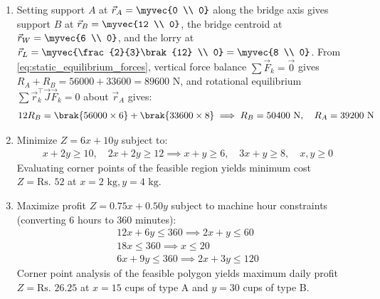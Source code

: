 \begin{enumerate}[label=\thesubsection.\arabic*, ref=\thesubsection.\theenumi]
\begin{enumerate}[label=\brak{\alph*}]
\begin{figure}[H]
			The following code stimulates the result.
			\vspace{0.5em}
			\noindent{}
		\end{figure}
		\item Setting support $A$ at $\vec{r}_A = \myvec{0 \\ 0}$ along the bridge axis gives support $B$ at $\vec{r}_B = \myvec{12 \\ 0}$, the bridge centroid at $\vec{r}_W = \myvec{6 \\ 0}$, and the lorry at $\vec{r}_L = \myvec{\frac{2}{3}\brak{12} \\ 0} = \myvec{8 \\ 0}$. From \eqref{eq:static_equilibrium_forces}, vertical force balance $\sum \vec{F}_k = \vec{0}$ gives $R_A + R_B = 56000 + 33600 = 89600\text{ N}$, and rotational equilibrium $\sum \vec{r}_k^{\top}\vec{J}\vec{F}_k = 0$ about $\vec{r}_A$ gives:
		\begin{align}
			12 R_B = \brak{56000 \times 6} + \brak{33600 \times 8} \implies R_B = 50400\text{ N}, \quad R_A = 39200\text{ N}
		\end{align}
		\item Minimize $Z = 6x + 10y$ subject to:
		\begin{align}
			x + 2y \ge 10, \quad 2x + 2y \ge 12 \implies x + y \ge 6, \quad 3x + y \ge 8, \quad x, y \ge 0
		\end{align}
		Evaluating corner points of the feasible region yields minimum cost $Z = \text{Rs. } 52$ at $x = 2\text{ kg}, y = 4\text{ kg}$.
		\begin{figure}[H]
			\centering
			\noindent{}
		\end{figure}
		\item Maximize profit $Z = 0.75x + 0.50y$ subject to machine hour constraints (converting 6 hours to 360 minutes):
		\begin{align}
			12x + 6y \le 360 \implies 2x + y \le 60 \\
			18x \le 360 \implies x \le 20 \\
			6x + 9y \le 360 \implies 2x + 3y \le 120
		\end{align}
		Corner point analysis of the feasible polygon yields maximum daily profit $Z = \text{Rs. } 26.25$ at $x = 15$ cups of type A and $y = 30$ cups of type B.
		\begin{figure}[H]
			\centering
			\noindent{}
		\end{figure}
	\end{enumerate}
	
\end{enumerate}